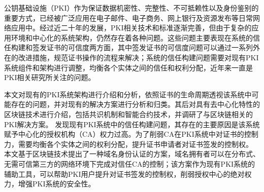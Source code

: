 
\begin{cabstract}





公钥基础设施（PKI）作为保证数据机密性、完整性、不可抵赖性以及身份鉴别的重要方式，已经被广泛应用在电子邮件、电子商务、网上银行及资源发布等日常网络应用中。经过近二十年的发展，PKI相关技术和标准逐渐完善，但由于复杂的应用环境和中心化的系统架构，仍然存在着各种问题。这些问题主要表现在系统的信任构建和签发证书的可信度两方面，其中签发证书的可信度问题可以通过一系列外在的改进措施，规范证书操作的流程来解决；系统的信任构建问题需要对现有PKI系统组件和架构进行调整，均衡各个实体之间的信任和权利分配，近年来一直是PKI相关研究所关注的问题。


本文对现有的PKI系统架构进行介绍和分析，依照证书的生命周期透视该系统中可能存在的问题，并对现有的解决方案进行分析和归类。其后对具有去中心化特性的区块链技术进行介绍，包括共识机制和智能合约技术，并调研了与区块链相关的PKI解决方案。
发现现有PKI系统中的信任构建问题，其存在的主要原因是该系统赋予中心化的授权机构（CA）权力过高。为了削弱CA在PKI系统中对证书的控制力，需要均衡各个实体之间的权利分配，提升证书申请者对证书签发的控制权。
本文基于区块链技术提出了一种域名身份认证的方案，域名拥有者可以在分布式、无需可信第三方的网络环境下完成对信任CA的控制；该方案作为现有PKI系统的辅助工具，可以帮助PKI用户提升对证书签发的控制权，削弱授权中心的绝对权力，增强PKI系统的安全性。


\end{cabstract}
